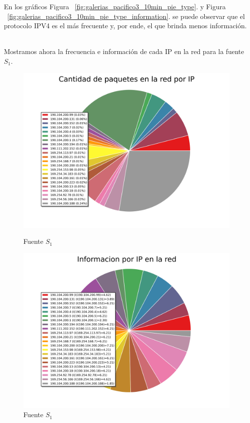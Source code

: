 En los gráficos Figura ~\ref{fig:galerias_pacifico3_10min_pie_type}. y Figura ~\ref{fig:galerias_pacifico3_10min_pie_type_information}. se puede observar que el protocolo IPV4 es el más frecuente y, por ende, el que brinda menos información.
\\
\\
\FloatBarrier

Mostramos ahora la frecuencia e información de cada IP en la red para la fuente $S_1$.

\begin{figure}[ht!]
  \centering
  \begin{minipage}[b]{0.48\textwidth}
    \includegraphics[width=\textwidth]{graficos/galerias_pacifico3_10min_pie_arp.png}
    \caption{Fuente $S_1$}
    \label{fig:galerias_pacifico3_10min_pie_arp}
  \end{minipage}
  \hfill
  \begin{minipage}[b]{0.48\textwidth}
    \includegraphics[width=\textwidth]{graficos/galerias_pacifico3_10min_pie_arp_information.png}
    \caption{Fuente $S_1$}
    \label{fig:galerias_pacifico3_10min_pie_arp_information}
  \end{minipage}
\end{figure}

